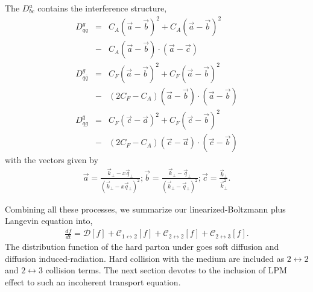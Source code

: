 The $D_{bc}^{a}$ contains the interference structure,
\begin{eqnarray}
D_{qq}^{g} &=& 
C_A(\vec{a}-\vec{b})^2 + C_A(\vec{a}-\vec{b})^2 \\\nonumber
&-& C_A (\vec{a}-\vec{b})\cdot (\vec{a}-\vec{c})
\\
D_{q\bar{q}}^{g} &=& 
C_F(\vec{a}-\vec{b})^2 + C_F(\vec{a}-\vec{b})^2 \\\nonumber
&-& (2C_F-C_A) (\vec{a}-\vec{b})\cdot (\vec{a}-\vec{b})
\\
D_{qg}^{q} &=& 
C_F(\vec{c}-\vec{a})^2 + C_F(\vec{c}-\vec{b})^2 \\\nonumber
&-& (2C_F-C_A) (\vec{c}-\vec{a})\cdot (\vec{c}-\vec{b})
\end{eqnarray}
with the vectors given by
\begin{eqnarray}
\vec{a} = \frac{\vec{k}_\perp - x\vec{q}_\perp}{(\vec{k}_\perp - x\vec{q}_\perp)^2};
\vec{b} = \frac{\vec{k}_\perp - \vec{q}_\perp}{(\vec{k}_\perp - \vec{q}_\perp)^2};
\vec{c} =  \frac{\vec{k}_\perp}{\vec{k}_\perp^2}.
\end{eqnarray}


Combining all these processes, we summarize our linearized-Boltzmann plus Langevin equation into,
\begin{eqnarray}
\frac{df}{dt} = \mathcal{D}[f] + \mathcal{C}_{1\leftrightarrow 2}[f] + \mathcal{C}_{2\leftrightarrow 2}[f] + \mathcal{C}_{2\leftrightarrow 3}[f].
\end{eqnarray}
The distribution function of the hard parton under goes soft diffusion and diffusion induced-radiation. 
Hard collision with the medium are included as $2\leftrightarrow 2$ and $2\leftrightarrow 3$ collision terms.
The next section devotes to the inclusion of LPM effect to such an incoherent transport equation.

